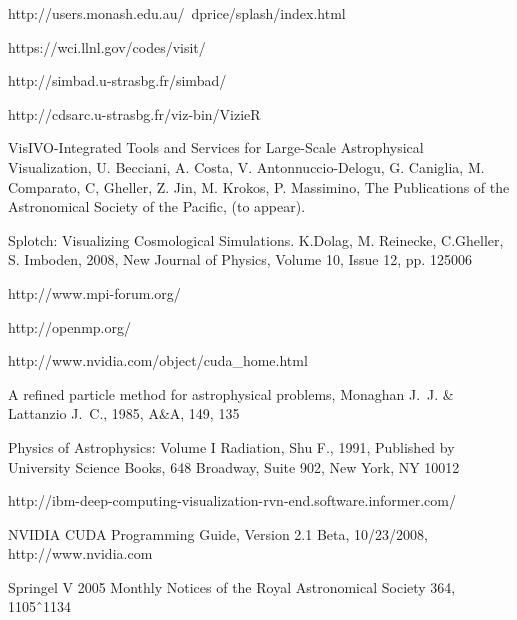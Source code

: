 \begin{thebibliography}{00}
 http://users.monash.edu.au/~dprice/splash/index.html

 https://wci.llnl.gov/codes/visit/

 http://simbad.u-strasbg.fr/simbad/

 http://cdsarc.u-strasbg.fr/viz-bin/VizieR

VisIVO-Integrated Tools and Services for Large-Scale Astrophysical Visualization, U. Becciani, A. Costa, V. Antonnuccio-Delogu, G. Caniglia, M. Comparato, C, Gheller, Z. Jin, M. Krokos, P. Massimino, The Publications of the Astronomical Society of the Pacific, (to appear).

Splotch: Visualizing Cosmological Simulations. K.Dolag, 
M. Reinecke, C.Gheller, S. Imboden, 2008, New Journal of Physics, Volume 10, Issue 12, pp. 125006

 http://www.mpi-forum.org/

 http://openmp.org/

 http://www.nvidia.com/object/cuda\_home.html

 A refined particle method for astrophysical problems, 
Monaghan J.~J. \& Lattanzio J.~C., 1985, A\&A, 149, 135

 Physics of Astrophysics: Volume I Radiation, Shu F., 1991,
Published by University Science Books, 648 Broadway, Suite 902, New York, NY 10012

 http://ibm-deep-computing-visualization-rvn-end.software.informer.com/

 NVIDIA CUDA Programming Guide, Version 2.1 Beta, 10/23/2008, http://www.nvidia.com

 Springel V 2005 Monthly Notices of the Royal Astronomical Society 364, 1105ˆ1134

\end{thebibliography}



